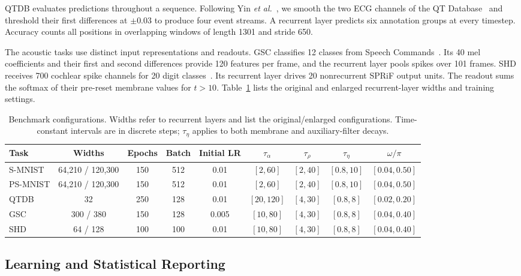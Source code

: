\documentclass[letterpaper,journal]{IEEEtran}
\begin{document}
QTDB evaluates predictions throughout a sequence. Following Yin \emph{et al.}~\cite{asrnn}, we smooth the two ECG channels of the QT Database~\cite{laguna1997database} and threshold their first differences at $\pm0.03$ to produce four event streams. A recurrent layer predicts six annotation groups at every timestep. Accuracy counts all positions in overlapping windows of length 1301 and stride 650.

The acoustic tasks use distinct input representations and readouts. GSC classifies 12 classes from Speech Commands~\cite{warden2018speech}. Its 40 mel coefficients and their first and second differences provide 120 features per frame, and the recurrent layer pools spikes over 101 frames. SHD receives 700 cochlear spike channels for 20 digit classes~\cite{cramer2022heidelberg}. Its recurrent layer drives 20 nonrecurrent SPRiF output units. The readout sums the softmax of their pre-reset membrane values for $t>10$. Table~\ref{tab:benchmark_config} lists the original and enlarged recurrent-layer widths and training settings.

\begin{table}[!tb]
\caption{Benchmark configurations. Widths refer to recurrent layers and list the original/enlarged configurations. Time-constant intervals are in discrete steps; $\tau_\eta$ applies to both membrane and auxiliary-filter decays.}
\label{tab:benchmark_config}
\centering\fontsize{6.5}{7.5}\selectfont
\setlength{\tabcolsep}{0.9pt}
\begin{tabular}{@{}lcccccccc@{}}
\toprule
Task & Widths & Epochs & Batch & Initial LR & $\tau_\alpha$ & $\tau_\rho$ & $\tau_\eta$ & $\omega/\pi$\\
\midrule
S-MNIST & 64,210 / 120,300 & 150 & 512 & 0.01 & $[2,60]$ & $[2,40]$ & $[0.8,10]$ & $[0.04,0.50]$\\
PS-MNIST & 64,210 / 120,300 & 150 & 512 & 0.01 & $[2,60]$ & $[2,40]$ & $[0.8,10]$ & $[0.04,0.50]$\\
QTDB & 32 & 250 & 128 & 0.01 & $[20,120]$ & $[4,30]$ & $[0.8,8]$ & $[0.02,0.20]$\\
GSC & 300 / 380 & 150 & 128 & 0.005 & $[10,80]$ & $[4,30]$ & $[0.8,8]$ & $[0.04,0.40]$\\
SHD & 64 / 128 & 100 & 100 & 0.01 & $[10,80]$ & $[4,30]$ & $[0.8,8]$ & $[0.04,0.40]$\\
\bottomrule
\end{tabular}
\end{table}

\subsection{Learning and Statistical Reporting}
\label{sec:training}
\label{sec:statistics}
\label{sec:learning}
\end{document}
